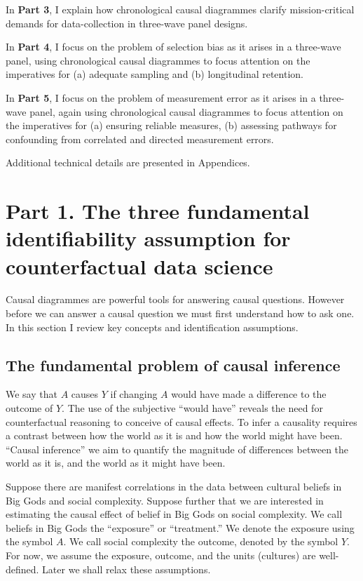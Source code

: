 \documentclass[
  singlecolumn]{report}
\begin{document}
In \textbf{Part 3}, I explain how chronological causal diagrammes
clarify mission-critical demands for data-collection in three-wave panel
designs.

In \textbf{Part 4}, I focus on the problem of selection bias as it
arises in a three-wave panel, using chronological causal diagrammes to
focus attention on the imperatives for (a) adequate sampling and (b)
longitudinal retention.

In \textbf{Part 5}, I focus on the problem of measurement error as it
arises in a three-wave panel, again using chronological causal
diagrammes to focus attention on the imperatives for (a) ensuring
reliable measures, (b) assessing pathways for confounding from
correlated and directed measurement errors.

Additional technical details are presented in Appendices.

\hypertarget{part-1.-the-three-fundamental-identifiability-assumption-for-counterfactual-data-science}{%
\section{Part 1. The three fundamental identifiability assumption for
counterfactual data
science}\label{part-1.-the-three-fundamental-identifiability-assumption-for-counterfactual-data-science}}

Causal diagrammes are powerful tools for answering causal questions.
However before we can answer a causal question we must first understand
how to ask one. In this section I review key concepts and identification
assumptions.

\hypertarget{the-fundamental-problem-of-causal-inference}{%
\subsection{The fundamental problem of causal
inference}\label{the-fundamental-problem-of-causal-inference}}

We say that \(A\) causes \(Y\) if changing \(A\) would have made a
difference to the outcome of \(Y\). The use of the subjective ``would
have'' reveals the need for counterfactual reasoning to conceive of
causal effects. To infer a causality requires a contrast between how the
world as it is and how the world might have been. ``Causal inference''
we aim to quantify the magnitude of differences between the world as it
is, and the world as it might have been.

Suppose there are manifest correlations in the data between cultural
beliefs in Big Gods and social complexity. Suppose further that we are
interested in estimating the causal effect of belief in Big Gods on
social complexity. We call beliefs in Big Gods the ``exposure'' or
``treatment.'' We denote the exposure using the symbol \(A\). We call
social complexity the outcome, denoted by the symbol \(Y\). For now, we
assume the exposure, outcome, and the units (cultures) are well-defined.
Later we shall relax these assumptions.
\end{document}
